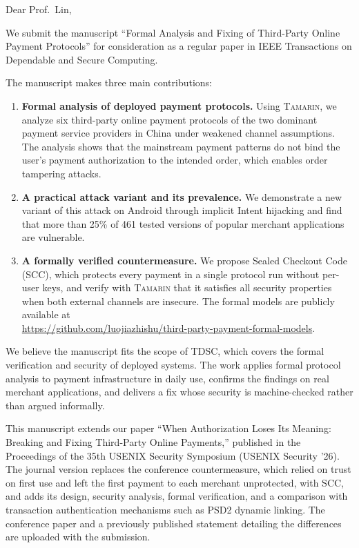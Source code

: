 \documentclass[11pt]{article}
\begin{document}
Dear Prof.\ Lin,

We submit the manuscript ``Formal Analysis and Fixing of Third-Party Online Payment Protocols'' for consideration as a regular paper in IEEE Transactions on Dependable and Secure Computing.

The manuscript makes three main contributions:
\begin{enumerate}
  \setlength{\itemsep}{2pt}
  \item \textbf{Formal analysis of deployed payment protocols.} Using \textsc{Tamarin}, we analyze six third-party online payment protocols of the two dominant payment service providers in China under weakened channel assumptions. The analysis shows that the mainstream payment patterns do not bind the user's payment authorization to the intended order, which enables order tampering attacks.
  \item \textbf{A practical attack variant and its prevalence.} We demonstrate a new variant of this attack on Android through implicit Intent hijacking and find that more than 25\% of 461 tested versions of popular merchant applications are vulnerable.
  \item \textbf{A formally verified countermeasure.} We propose Sealed Checkout Code (SCC), which protects every payment in a single protocol run without per-user keys, and verify with \textsc{Tamarin} that it satisfies all security properties when both external channels are insecure. The formal models are publicly available at \\
\url{https://github.com/luojiazhishu/third-party-payment-formal-models}.
\end{enumerate}

We believe the manuscript fits the scope of TDSC, which covers the formal verification and security of deployed systems.
The work applies formal protocol analysis to payment infrastructure in daily use, confirms the findings on real merchant applications, and delivers a fix whose security is machine-checked rather than argued informally.

This manuscript extends our paper ``When Authorization Loses Its Meaning: Breaking and Fixing Third-Party Online Payments,'' published in the Proceedings of the 35th USENIX Security Symposium (USENIX Security '26).
The journal version replaces the conference countermeasure, which relied on trust on first use and left the first payment to each merchant unprotected, with SCC, and adds its design, security analysis, formal verification, and a comparison with transaction authentication mechanisms such as PSD2 dynamic linking.
The conference paper and a previously published statement detailing the differences are uploaded with the submission.
\end{document}
